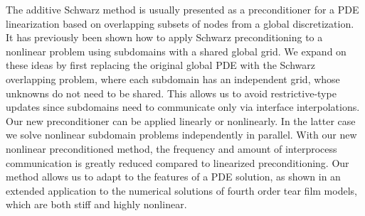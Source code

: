 The additive Schwarz method is usually presented as a preconditioner for a PDE linearization based on overlapping subsets of nodes from a global discretization. It has previously been shown how to apply Schwarz preconditioning to a nonlinear problem using subdomains with a shared global grid. We expand on these ideas by first replacing the original global PDE with the Schwarz overlapping problem, where each subdomain has an independent grid, whose unknowns do not need to be shared. This allows us to avoid
restrictive-type updates since subdomains need to communicate only via interface interpolations. Our new preconditioner can be applied linearly or nonlinearly. In the latter case we solve nonlinear subdomain problems independently in parallel. With our new nonlinear preconditioned method, the frequency and amount of interprocess communication is greatly reduced compared to linearized preconditioning. Our method allows us to adapt to the features of a PDE solution, as shown in an extended application to the numerical solutions of fourth order tear film models, which are both stiff and highly nonlinear.

